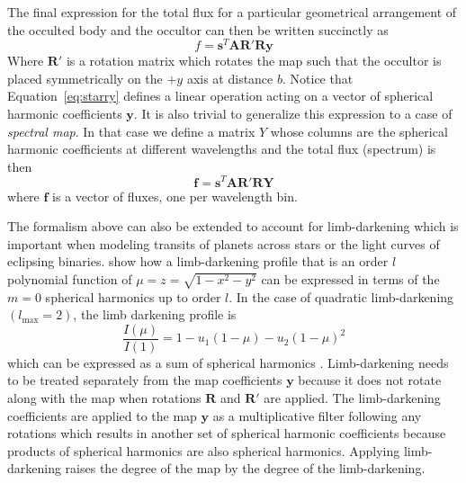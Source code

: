 \documentclass[12pt]{report}
\begin{document}
The final expression for the total flux for a particular geometrical
arrangement of the occulted body and the occultor can then be written
succinctly as
\begin{equation}
    f = \mathbf{s}^T\mathbf{A}\mathbf{R}'\mathbf{R}\mathbf{y}
    \label{eq:starry}
\end{equation}
Where $\mathbf{R}'$ is a rotation matrix which rotates the map such that the occultor
is placed symmetrically on the $+y$ axis at distance $b$.
Notice that Equation~\ref{eq:starry} defines a linear operation acting on a vector
of spherical harmonic coefficients $\mathbf{y}$.
It is also trivial to generalize this expression to a case of \emph{spectral map}. In
that case we define a matrix $Y$ whose columns are the spherical harmonic coefficients
at different wavelengths and the total flux (spectrum) is then
\begin{equation}
    \mathbf{f} = \mathbf{s}^T\mathbf{A}\mathbf{R}'\mathbf{R}\mathbf{Y}
    \label{eq:starry_mw}
\end{equation}
where $\mathbf{f}$ is a vector of fluxes, one per wavelength bin.

The formalism above can also be extended to account for limb-darkening which is
important when modeling transits of planets across stars or the light curves of
eclipsing binaries. \citet{2020AJ....159..123A} show how a limb-darkening
profile that is an order $l$ polynomial function of
$\mu=z=\sqrt{1-x^{2}-y^{2}}$ can be expressed in terms of the $m=0$ spherical
harmonics up to order $l$. In the case of quadratic limb-darkening
$(l_\mathrm{max}=2)$, the limb darkening profile is
\begin{equation}
    \frac{I(\mu)}{I(1)}=1-u_{1}(1-\mu)-u_{2}(1-\mu)^{2}
\end{equation}
which can be expressed as a sum of spherical harmonics
\citep[Equation 38 in][]{2019AJ....157...64L}. Limb-darkening needs to be
treated separately from the map coefficients $\mathbf{y}$ because it does not rotate along with the map
when rotations $\mathbf{R}$ and $\mathbf{R}'$ are applied. The limb-darkening
coefficients are applied to the map $\mathbf{y}$ as a multiplicative filter
following any rotations which results in another set of spherical harmonic
coefficients because products of spherical harmonics are also spherical
harmonics. Applying limb-darkening raises the degree of the map by the degree
of the limb-darkening.
\end{document}
